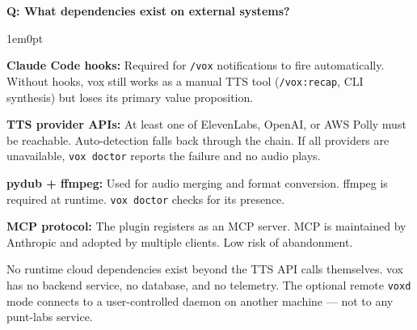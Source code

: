 \documentclass[11pt,letterpaper]{article}
\newcounter{faqnum}
\newenvironment{faqpair}[1]{%
  \needspace{4\baselineskip}%
  \vspace{0.5em}%
  \refstepcounter{faqnum}%
  \noindent\textbf{\color{SectionBlue}Q\thefaqnum: #1}\par\nopagebreak[4]%
  \vspace{0.2em}%
  \begin{adjustwidth}{1em}{0pt}%
  \setlength{\parindent}{0pt}%
}{%
  \end{adjustwidth}%
  \vspace{0.5em}%
}
\begin{document}
\begin{faqpair}{What dependencies exist on external systems?}
  \textbf{Claude Code hooks:} Required for \texttt{/vox} notifications to fire
  automatically. Without hooks, vox still works as a manual TTS tool
  (\texttt{/vox:recap}, CLI synthesis) but loses its primary value proposition.

  \textbf{TTS provider APIs:} At least one of ElevenLabs, OpenAI, or AWS
  Polly must be reachable. Auto-detection falls back through the chain.
  If all providers are unavailable, \texttt{vox doctor} reports the failure
  and no audio plays.

  \textbf{pydub + ffmpeg:} Used for audio merging and format conversion.
  ffmpeg is required at runtime. \texttt{vox doctor} checks for its presence.

  \textbf{MCP protocol:} The plugin registers as an MCP server. MCP is
  maintained by Anthropic and adopted by multiple clients. Low risk of
  abandonment.

  No runtime cloud dependencies exist beyond the TTS API calls themselves.
  vox has no backend service, no database, and no telemetry. The optional
  remote \texttt{voxd} mode connects to a user-controlled daemon on another
  machine --- not to any punt-labs service.
\end{faqpair}
\end{document}
